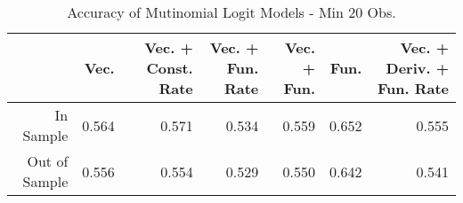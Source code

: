 \begin{table}[ht]
\centering
\begin{tabular}{rrrrrrr}
  \hline
 & Vec. & Vec. + Const. Rate & Vec. + Fun. Rate & Vec. + Fun. & Fun. & Vec. + Deriv. + Fun. Rate \\ 
  \hline
In Sample & 0.564 & 0.571 & 0.534 & 0.559 & 0.652 & 0.555 \\ 
  Out of Sample & 0.556 & 0.554 & 0.529 & 0.550 & 0.642 & 0.541 \\ 
   \hline
\end{tabular}
\caption{Accuracy of Mutinomial Logit Models - Min 20 Obs.} 
\label{multi_20obs_acc}
\end{table}
